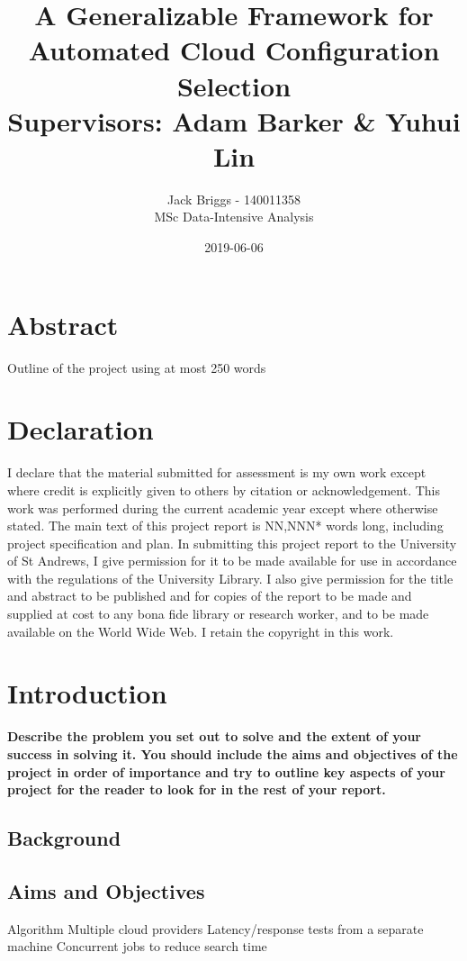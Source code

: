 \documentclass{article}
\title{\vspace{-2.0cm} A Generalizable Framework for Automated Cloud Configuration Selection \\ \vspace{0.5cm} \large Supervisors: Adam Barker \& Yuhui Lin}
\date{2019-06-06}
\author{Jack Briggs - 140011358 \\ MSc Data-Intensive Analysis}
\begin{document}
\maketitle
\newpage
\section*{Abstract}
Outline of the project using at most 250 words
\newpage
\section*{Declaration}
I declare that the material submitted for assessment
is my own work except where credit is explicitly
given to others by citation or acknowledgement. This
work was performed during the current academic year
except where otherwise stated.
The main text of this project report is NN,NNN* words
long, including project specification and plan.
In submitting this project report to the University of St
Andrews, I give permission for it to be made
available for use in accordance with the regulations of the University Library. I also give permission for the title and abstract to be published and for copies of the report to be made and supplied at cost to any bona fide library or research worker, and to be made available on the World Wide Web. I retain the copyright in this work.
\newpage
\tableofcontents
\listoffigures
\newpage
\section{Introduction}
\textbf{Describe the problem you set out to solve and the extent
of your success in solving it. You should include the aims
and objectives of the project in order of importance and
try to outline key aspects of your project for the reader to look for in the rest of your report.}
\subsection{Background}

\subsection{Aims and Objectives}
Algorithm
Multiple cloud providers
Latency/response tests from a separate machine
Concurrent jobs to reduce search time
\end{document}
